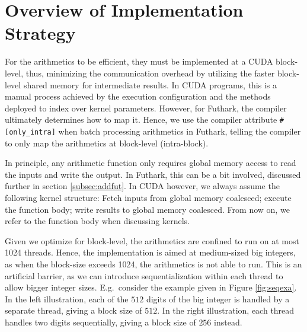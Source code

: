 \section{Overview of Implementation Strategy}
\label{sec:strat}

For the arithmetics to be efficient, they must be implemented at a CUDA
block-level, thus, minimizing the communication overhead by utilizing the faster
block-level shared memory for intermediate results. In CUDA programs, this is a
manual process achieved by the execution configuration and the methods deployed
to index over kernel parameters. However, for Futhark, the compiler ultimately
determines how to map it. Hence, we use the compiler attribute
\texttt{\#[only\_intra]} when batch processing arithmetics in Futhark, telling
the compiler to only map the arithmetics at block-level (intra-block).

In principle, any arithmetic function only requires global memory access to read
the inputs and write the output. In Futhark, this can be a bit involved,
discussed further in section \ref{subsec:addfut}. In CUDA however, we always
assume the following kernel structure: Fetch inputs from global memory
coalesced; execute the function body; write results to global memory
coalesced. From now on, we refer to the function body when discussing kernels.

Given we optimize for block-level, the arithmetics are confined to run on at
most 1024 threads.  Hence, the implementation is aimed at medium-sized big
integers, as when the block-size exceeds 1024, the arithmetics is not able to
run. This is an artificial barrier, as we can introduce sequentialization within
each thread to allow bigger integer sizes. E.g.\ consider the example given in
Figure \ref{fig:seqexa}. In the left illustration, each of the $512$ digits of
the big integer is handled by a separate thread, giving a block size of
$512$. In the right illustration, each thread handles two digits sequentially,
giving a block size of $256$ instead.

